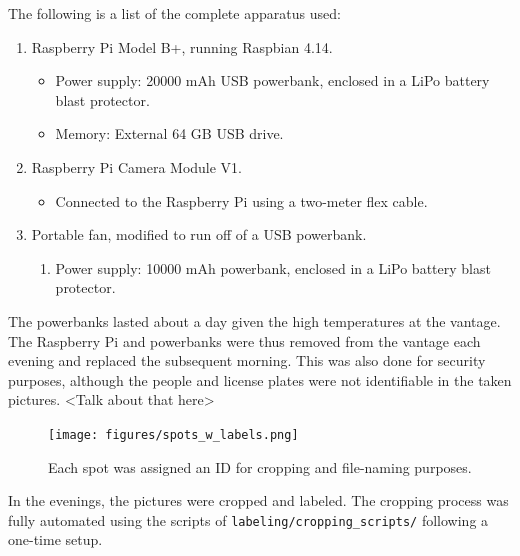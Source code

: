 \documentclass[a4paper, 11pt]{article} %
\begin{document}
	The following is a list of the complete apparatus used:
	\begin{enumerate}
		\item Raspberry Pi Model B+, running Raspbian 4.14.
		\begin{itemize}
			\item[] Power supply: 20000 mAh USB powerbank, enclosed in a LiPo battery blast protector.
			\item[] Memory: External 64 GB USB drive.
		\end{itemize}
		\item Raspberry Pi Camera Module V1.
		\begin{itemize}
			\item[] Connected to the Raspberry Pi using a two-meter flex cable.
		\end{itemize}
		\item Portable fan, modified to run off of a USB powerbank.
		\begin{enumerate}
			\item[] Power supply: 10000 mAh powerbank, enclosed in a LiPo battery blast protector.
		\end{enumerate}
	\end{enumerate}
	The powerbanks lasted about a day given the high temperatures at the vantage. The Raspberry Pi 
	and powerbanks were thus removed from the vantage each evening and replaced the subsequent 
	morning. This was also done for security purposes, although the people and license plates were not 
	identifiable in the taken pictures.
	<Talk about that here>
		\begin{figure}[H]
		\centering
		\texttt{[image: figures/spots\_w\_labels.png]}
		\caption{Each spot was assigned an ID for cropping and file-naming purposes.}
	\end{figure}

	In the evenings, the pictures were cropped and labeled. The cropping process was fully automated 
	using the scripts of \texttt{labeling/cropping\_scripts/} following a one-time setup.
\end{document}
